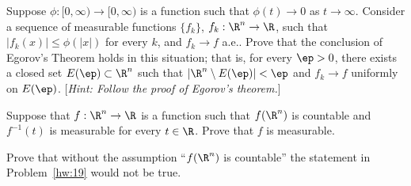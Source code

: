 \begin{hw} \label{hw:18}
Suppose $\phi: [0, \infty )\to [0, \infty)$ is a function such that $\phi(t) \to 0$ as $t \to \infty$. Consider a sequence of measurable functions $\{f_k\}$, $f_k: \R^n \to \R$, such that $|f_k(x)| \leq \phi(|x|)$ for every $k$, and $f_k \to f$ a.e.. Prove that the conclusion of Egorov's Theorem holds in this situation; that is, for every $\ep>0$, there exists a closed set $E(\ep) \subset \R^n$ such that $|\R^n \setminus E(\ep)| < \ep$ and $f_k \to f$ uniformly on $E(\ep)$. [\emph{Hint: Follow the proof of Egorov's theorem.}] \\
\end{hw}


\begin{hw} \label{hw:19}
Suppose that $f: \R^n \to \R$ is a function such that $f(\R^n)$ is countable and $f^{-1}(t)$ is measurable for every $t \in \R$. Prove that $f$ is measurable. \\
\end{hw}


\begin{hw} \label{hw:20}
Prove that without the assumption ``$f(\R^n)$ is countable'' the statement in Problem~\ref{hw:19} would not be true. \\
\end{hw}








